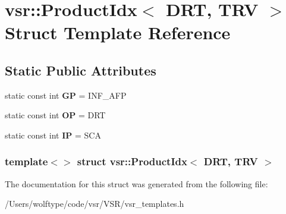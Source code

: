 \hypertarget{structvsr_1_1_product_idx_3_01_d_r_t_00_01_t_r_v_01_4}{\section{vsr\-:\-:Product\-Idx$<$ D\-R\-T, T\-R\-V $>$ Struct Template Reference}
\label{structvsr_1_1_product_idx_3_01_d_r_t_00_01_t_r_v_01_4}
}
\subsection*{Static Public Attributes}
\begin{DoxyCompactItemize}
\item 
\hypertarget{structvsr_1_1_product_idx_3_01_d_r_t_00_01_t_r_v_01_4_a57e365cc404dc767cecc7ab525cc815b}{static const int {\bfseries G\-P} = I\-N\-F\-\_\-\-A\-F\-P}\label{structvsr_1_1_product_idx_3_01_d_r_t_00_01_t_r_v_01_4_a57e365cc404dc767cecc7ab525cc815b}

\item 
\hypertarget{structvsr_1_1_product_idx_3_01_d_r_t_00_01_t_r_v_01_4_a97446d285bd2d722dc9072922184b8cc}{static const int {\bfseries O\-P} = D\-R\-T}\label{structvsr_1_1_product_idx_3_01_d_r_t_00_01_t_r_v_01_4_a97446d285bd2d722dc9072922184b8cc}

\item 
\hypertarget{structvsr_1_1_product_idx_3_01_d_r_t_00_01_t_r_v_01_4_a111631afdf9a6fa81878682366510c1a}{static const int {\bfseries I\-P} = S\-C\-A}\label{structvsr_1_1_product_idx_3_01_d_r_t_00_01_t_r_v_01_4_a111631afdf9a6fa81878682366510c1a}

\end{DoxyCompactItemize}
\subsubsection*{template$<$$>$ struct vsr\-::\-Product\-Idx$<$ D\-R\-T, T\-R\-V $>$}



The documentation for this struct was generated from the following file\-:\begin{DoxyCompactItemize}
\item 
/\-Users/wolftype/code/vsr/\-V\-S\-R/vsr\-\_\-templates.\-h\end{DoxyCompactItemize}
